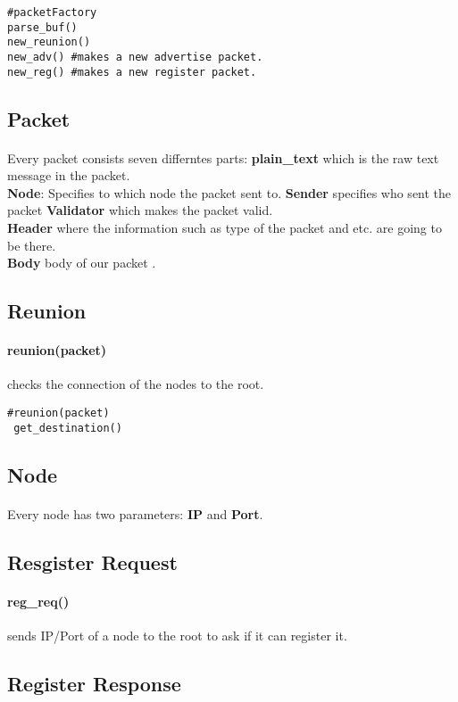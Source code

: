 \documentclass{article}
\begin{document}
\begin{lstlisting}
#packetFactory
parse_buf()
new_reunion()
new_adv() #makes a new advertise packet.
new_reg() #makes a new register packet.
\end{lstlisting}
\subsection{Packet}
\paragraph{}Every packet consists seven differntes parts: \textbf{plain\_text} which is the raw text message in the packet.\\
\textbf{Node}: Specifies to which node the packet sent to. \textbf{Sender} specifies who sent the packet \textbf{Validator} which makes the packet valid.\\ \textbf{Header} where the information such as type of the packet and etc. are going to be there.\\ \textbf{Body} body of our packet .
\subsection{Reunion}
\paragraph{reunion(packet)} checks the connection of the nodes to the root.
\begin{lstlisting}
#reunion(packet)
 get_destination()
\end{lstlisting}
\subsection{Node}
\paragraph{}Every node has two parameters: \textbf{IP} and \textbf{Port}.
\subsection{Resgister Request}
\paragraph{reg\_req()} sends IP/Port of a node to the root to ask if it can register it.
\subsection{Register Response}
\end{document}
